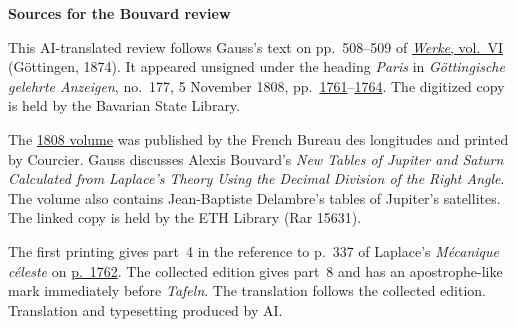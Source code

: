 \clearpage\thispagestyle{empty}
\begin{center}\textbf{Sources for the Bouvard review}\end{center}
\noindent This AI-translated review follows Gauss’s text on pp.~508--509 of \href{https://gdz.sub.uni-goettingen.de/id/PPN236007467}{\textit{Werke}, vol.~VI} (Göttingen, 1874). It appeared unsigned under the heading \emph{Paris} in \textit{Göttingische gelehrte Anzeigen}, no.~177, 5 November 1808, pp.~\href{https://api.digitale-sammlungen.de/iiif/image/v2/bsb10538674_00745/full/1800,/0/default.jpg}{1761}--\href{https://api.digitale-sammlungen.de/iiif/image/v2/bsb10538674_00748/full/1800,/0/default.jpg}{1764}. The digitized copy is held by the Bavarian State Library.
\par\smallskip\noindent The \href{https://www.e-rara.ch/zut/content/titleinfo/21914082}{1808 volume} was published by the French Bureau des longitudes and printed by Courcier. Gauss discusses Alexis Bouvard’s \emph{New Tables of Jupiter and Saturn Calculated from Laplace’s Theory Using the Decimal Division of the Right Angle}. The volume also contains Jean-Baptiste Delambre’s tables of Jupiter’s satellites. The linked copy is held by the ETH Library (Rar 15631).
\par\smallskip\noindent The first printing gives part~4 in the reference to p.~337 of Laplace’s \textit{Mécanique céleste} on \href{https://api.digitale-sammlungen.de/iiif/image/v2/bsb10538674_00746/full/1800,/0/default.jpg}{p.~1762}. The collected edition gives part~8 and has an apostrophe-like mark immediately before \emph{Tafeln}. The translation follows the collected edition. Translation and typesetting produced by AI.
\clearpage
